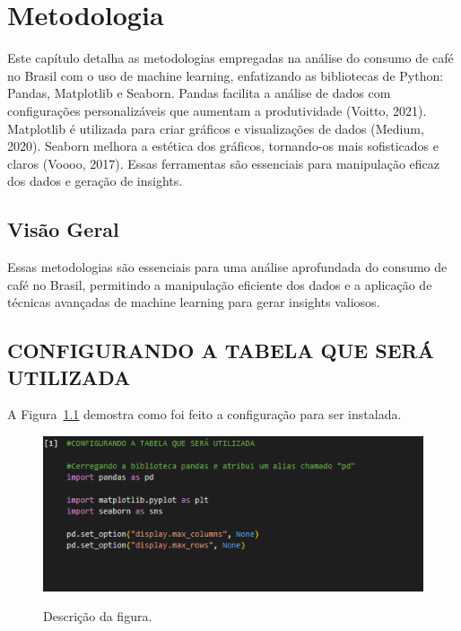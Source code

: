 \chapter{Metodologia}
\label{ch:identificador}
	\begin{resumocapitulo}
		Este capítulo detalha as metodologias empregadas na análise do consumo de café no Brasil com o uso de machine learning, enfatizando as bibliotecas de Python: Pandas, Matplotlib e Seaborn. Pandas facilita a análise de dados com configurações personalizáveis que aumentam a produtividade (Voitto, 2021). Matplotlib é utilizada para criar gráficos e visualizações de dados (Medium, 2020). Seaborn melhora a estética dos gráficos, tornando-os mais sofisticados e claros (Voooo, 2017). Essas ferramentas são essenciais para manipulação eficaz dos dados e geração de insights.
	\end{resumocapitulo}

	\section{Visão Geral}
			Essas metodologias são essenciais para uma análise aprofundada do consumo de café no Brasil, permitindo a manipulação eficiente dos dados e a aplicação de técnicas avançadas de machine learning para gerar insights valiosos.

   
	\section{CONFIGURANDO A TABELA QUE SERÁ UTILIZADA}
	\label{sec:identificao}
\label{sec:figura}
A Figura~\ref{figuras/configuraçao-introduçao.png} demostra como foi feito a configuração para ser instalada.
\begin{figure}[!ht]
	{\centering
		\caption{Descrição da figura.}
		\includegraphics[width=1.0\textwidth]{figuras/configuraçao-introduçao.png}
		\label{figuras/configuraçao-introduçao.png}
	}
\end{figure} \\ \\ \\ \\ \\ \\ \\ 


